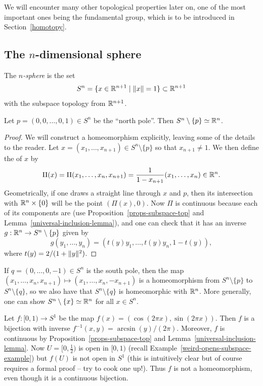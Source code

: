 We will encounter many other topological properties later on, one of the most important ones being the fundamental group, which is to be introduced in Section~\ref{homotopy}.

\subsection{The $n$-dimensional sphere}
\begin{defn}
  The \emph{$n$-sphere} is the set
  \[
    S^n = \{ x \in \mathbb{R}^{n+1} \mid \lVert x \rVert = 1 \} \subset \mathbb{R}^{n+1}
  \]
  with the subspace topology from $\mathbb{R}^{n+1}$.
\end{defn}
\begin{prop}
  \label{north-pole-removed}
  Let $p = (0,0,\dots,0,1) \in S^n$ be the ``north pole''. Then $S^n \setminus \{p\} \simeq \mathbb{R}^n$.
\end{prop}
\begin{proof}
  We will construct a homeomorphism explicitly, leaving some of the details to the reader. Let $x = (x_1, \dots, x_{n+1}) \in S^n \setminus \{ p \}$ so that $x_{n+1} \not= 1$. We then define the  of $x$ by
  \[
    \Pi(x) = \Pi(x_1,\dots,x_n,x_{n+1}) = \frac{1}{1-x_{n+1}} (x_1, \dots, x_n) \in \mathbb{R}^n.
  \]
  Geometrically, if one draws a straight line through $x$ and $p$, then its intersection with $\mathbb{R}^n \times \{0 \}$ will be the point $(\Pi(x),0)$. Now $\Pi$ is continuous because each of its components are (use Proposition~\ref{props-subspace-top} and Lemma~\ref{universal-inclusion-lemma}), and one can check that it has an inverse $g : \mathbb{R}^n \to S^n \setminus \{p \}$ given by
  \[
    g(y_1, \dots, y_n) = (t(y) y_1, \dots, t(y)y_n, 1-t(y)),
  \]
  where $t(y) = 2/(1+\lVert y \rVert^2)$.
\end{proof}
\begin{rem}
  If $q = (0,\dots,0,-1) \in S^n$ is the south pole, then the map $(x_1, \dots, x_n,x_{n+1}) \mapsto (x_1,\dots,x_n,-x_{n+1})$ is a homeomorphism from $S^n \setminus \{p\}$ to $S^n \setminus \{ q \}$, so we also have that $S^n \setminus \{ q \}$ is homeomorphic with $\mathbb{R}^n$. More generally, one can show $S^n \setminus \{x\} \simeq \mathbb{R}^n$ for all $x \in S^n$.
\end{rem}
\begin{example}
  Let $f : [0,1) \to S^1$ be the map $f(x) = (\cos (2\pi x), \sin(2\pi x))$. Then $f$ is a bijection with inverse $f^{-1}(x,y) = \arcsin(y)/(2\pi)$. Moreover, $f$ is continuous by Proposition~\ref{props-subspace-top} and Lemma~\ref{universal-inclusion-lemma}. Now $U = [0,\tfrac{1}{2})$ is open in $[0,1)$ (recall Example~\ref{weird-opens-subspace-example}) but $f(U)$ is not open in $S^1$ (this is intuitively clear but of course requires a formal proof -- try to cook one up!). Thus $f$ is not a homeomorphism, even though it is a continuous bijection.
\end{example}

